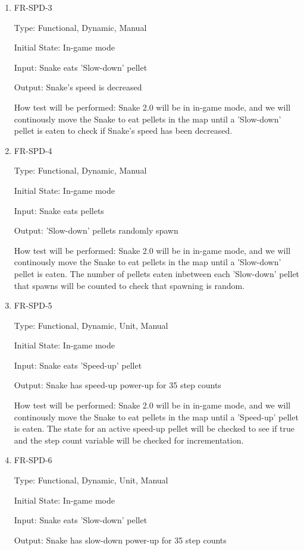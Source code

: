 \documentclass[12pt, titlepage]{article}
\begin{document}
\begin{enumerate}
\item{FR-SPD-3}
\label{fr:spd-3}

Type: Functional, Dynamic, Manual

Initial State: In-game mode

Input: Snake eats 'Slow-down' pellet

Output: Snake's speed is decreased

How test will be performed: Snake 2.0 will be in in-game mode, and we will continously move the Snake to eat pellets in the map until a 'Slow-down' pellet is eaten to check if Snake's speed has  been decreased.

\item{FR-SPD-4}
\label{fr:spd-4}

Type: Functional, Dynamic, Manual

Initial State: In-game mode

Input: Snake eats pellets

Output: 'Slow-down' pellets randomly spawn

How test will be performed: Snake 2.0 will be in in-game mode, and we will continously move the Snake to eat pellets in the map until a 'Slow-down' pellet is eaten. The number of pellets eaten inbetween each 'Slow-down' pellet that spawns will be counted to check that spawning is random.

\item{FR-SPD-5}
\label{fr:spd-5}

Type: Functional, Dynamic, Unit, Manual

Initial State: In-game mode

Input: Snake eats 'Speed-up' pellet

Output: Snake has speed-up power-up for 35 step counts

How test will be performed: Snake 2.0 will be in in-game mode, and we will continously move the Snake to eat pellets in the map until a 'Speed-up'  pellet is eaten. The state for an active speed-up pellet will be checked to see if true and the step count variable will be checked for incrementation. 

\item{FR-SPD-6}
\label{fr:spd-6}

Type: Functional, Dynamic, Unit, Manual

Initial State: In-game mode

Input: Snake eats 'Slow-down' pellet

Output: Snake has slow-down power-up for 35 step counts


\end{enumerate}
\end{document}
